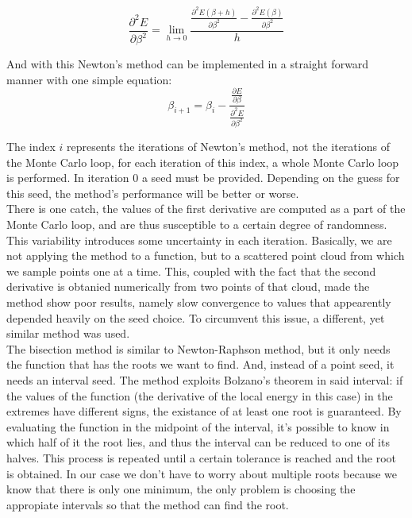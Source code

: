 		\begin{equation}\frac{\partial^2 E}{\partial\beta^2}=\lim_{h\to 0}\frac{\frac{\partial^2 E\left(\beta+h\right)}{\partial\beta^2}-\frac{\partial^2 E\left(\beta\right)}{\partial\beta^2}}{h}\end{equation}

		And with this Newton's method can be implemented in a straight forward manner with one simple equation:\\

		\begin{equation}\beta_{i+1}=\beta_i-\frac{\frac{\partial E}{\partial\beta}}{\frac{\partial^2 E}{\partial\beta^2}}\end{equation}

		The index $i$ represents the iterations of Newton's method, not the iterations of the Monte Carlo loop, for each iteration of this index, a whole Monte Carlo loop is performed. In iteration $0$ a seed must be provided. Depending on the guess for this seed, the method's performance will be better or worse.\\

		There is one catch, the values of the first derivative are computed as a part of the Monte Carlo loop, and are thus susceptible to a certain degree of randomness. This variability introduces some uncertainty in each iteration. Basically, we are not applying the method to a function, but to a scattered point cloud from which we sample points one at a time. This, coupled with the fact that the second derivative is obtanied numerically from two points of that cloud, made the method show poor results, namely slow convergence to values that appearently depended heavily on the seed choice. To circumvent this issue, a different, yet similar method was used.\\

		The bisection method is similar to Newton-Raphson method, but it only needs the function that has the roots we want to find. And, instead of a point seed, it needs an interval seed. The method exploits Bolzano's theorem in said interval: if the values of the function (the derivative of the local energy in this case) in the extremes have different signs, the existance of at least one root is guaranteed. By evaluating the function in the midpoint of the interval, it's possible to know in which half of it the root lies, and thus the interval can be reduced to one of its halves. This process is repeated until a certain tolerance is reached and the root is obtained. In our case we don't have to worry about multiple roots because we know that there is only one minimum, the only problem is choosing the appropiate intervals so that the method can find the root.\\

